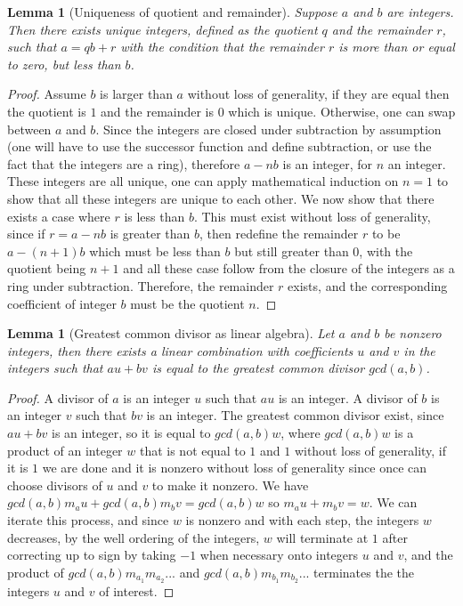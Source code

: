 \documentclass{tufte-book}
\newtheorem{lemma}[theorem]{Lemma}
\begin{document}
\begin{lemma}[Uniqueness of quotient and remainder]\label{lem:uniqueness-quot}
  Suppose $a$ and $b$ are integers. Then there exists unique integers, defined as the quotient $q$ and the remainder $r$, such that $a = qb + r$ with the condition that the remainder $r$ is more than or equal to zero, but less than $b$.
\end{lemma}

\begin{proof}
  Assume $b$ is larger than $a$ without loss of generality, if they are equal then the quotient is $1$ and the remainder is $0$ which is unique. Otherwise, one can swap between $a$ and $b$.
  Since the integers are closed under subtraction by assumption (one will have to use the successor function and define subtraction, or use the fact that the integers are a ring), therefore $a - nb$ is an integer, for $n$ an integer. These integers are all unique, one can apply mathematical induction on $n = 1$ to show that all these integers are unique to each other. We now show that there exists a case where $r$ is less than $b$. This must exist without loss of generality, since if $r = a - nb$ is greater than $b$, then redefine the remainder $r$ to be $a - (n+1)b$ which must be less than $b$ but still greater than $0$, with the quotient being $n+1$ and all these case follow from the closure of the integers as a ring under subtraction. Therefore, the remainder $r$ exists, and the corresponding coefficient of integer $b$ must be the quotient $n$.
\end{proof}

\begin{lemma}[Greatest common divisor as linear algebra]\label{lem:gcd-lin-alg}
  Let $a$ and $b$ be nonzero integers, then there exists a linear combination with coefficients $u$ and $v$ in the integers such that $au + bv$ is equal to the greatest common divisor $gcd(a,b)$.
\end{lemma}

\begin{proof}
  A divisor of $a$ is an integer $u$ such that $au$ is an integer.
  A divisor of $b$ is an integer $v$ such that $bv$ is an integer.
  The greatest common divisor exist, since $au + bv$ is an integer, so it is equal to $gcd(a,b)w$, where $gcd(a,b)w$ is 
  a product of an integer $w$ that is not equal to $1$ and $1$ without loss of generality, if it is $1$ we are done and it is
  nonzero without loss of generality since once can choose divisors of $u$ and $v$ to make it nonzero.
  We have $gcd(a,b) m_a u + gcd(a,b) m_b v = gcd(a,b) w$ so $m_a u + m_b v = w$. We can iterate this process, and since $w$ is nonzero and with each step, the integers $w$ decreases, by the well ordering of the integers, $w$ will terminate at $1$ after correcting up to sign by taking $-1$ when necessary onto integers $u$ and $v$, and the product of $gcd(a,b) m_{a_1} m_{a_2}...$ and $gcd(a,b) m_{b_1} m_{b_2}...$ terminates the the integers $u$ and $v$ of interest.
\end{proof}
\end{document}
